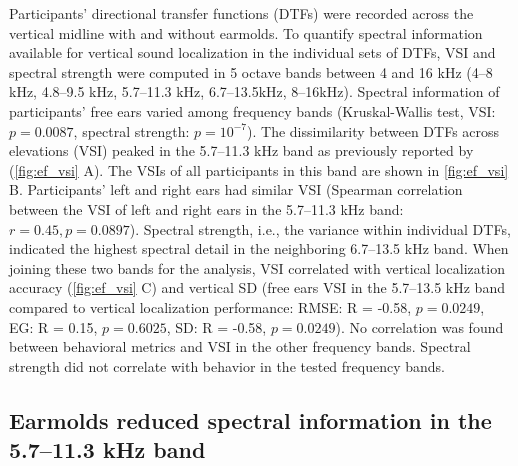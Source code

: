 Participants' directional transfer functions (DTFs) were recorded across the vertical midline with and without earmolds. To quantify spectral information available for vertical sound localization in the individual sets of DTFs, VSI \citep{trapeau_fast_2016} and spectral strength \citep{andeol_sound_2013} were computed in 5 octave bands between 4 and 16 kHz (4–8 kHz, 4.8–9.5 kHz, 5.7–11.3 kHz, 6.7–13.5kHz, 8–16kHz). Spectral information of participants’ free ears varied among frequency bands (Kruskal-Wallis test, VSI: $p = 0.0087$, spectral strength: $p = 10^{-7}$). The dissimilarity between DTFs across elevations (VSI) peaked in the 5.7–11.3 kHz band as previously reported by \citet{trapeau_fast_2016} (\cref{fig:ef_vsi} A). The VSIs of all participants in this band are shown in \cref{fig:ef_vsi} B. Participants' left and right ears had similar VSI (Spearman correlation between the VSI of left and right ears in the 5.7–11.3 kHz band: $r = 0.45, p = 0.0897$). Spectral strength, i.e., the variance within individual DTFs, indicated the highest spectral detail in the neighboring 6.7–13.5 kHz band. When joining these two bands for the analysis, VSI correlated with vertical localization accuracy (\cref{fig:ef_vsi} C) and vertical SD (free ears VSI in the 5.7–13.5 kHz band compared to vertical localization performance: RMSE: R = -0.58, $p = 0.0249$, EG: R = 0.15, $p = 0.6025$, SD: R = -0.58, $p = 0.0249$). No correlation was found between behavioral metrics and VSI in the other frequency bands. Spectral strength did not correlate with behavior in the tested frequency bands.

\subsection{Earmolds reduced spectral information in the 5.7–11.3 kHz band}

